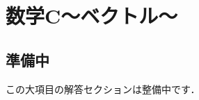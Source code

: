 \documentclass[../../uem_mat_std_a.tex]{subfiles}
\begin{document}
\section{数学C～ベクトル～}

\subsection*{準備中}
この大項目の解答セクションは整備中です．
\end{document}
